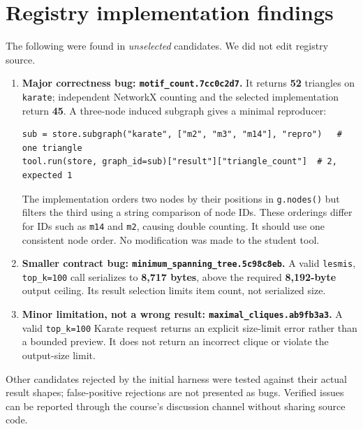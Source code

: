 \documentclass[10pt,a4paper]{article}
\newcommand{\tool}[1]{\texttt{#1}}
\begin{document}
\section{Registry implementation findings}
The following were found in \emph{unselected} candidates. We did not edit registry source.
\begin{enumerate}
\item \textbf{Major correctness bug: \tool{motif\_count.7cc0c2d7}.} It returns \textbf{52}
  triangles on \tool{karate}; independent NetworkX counting and the selected implementation return
  \textbf{45}. A three-node induced subgraph gives a minimal reproducer:
\begin{verbatim}
sub = store.subgraph("karate", ["m2", "m3", "m14"], "repro")   # one triangle
tool.run(store, graph_id=sub)["result"]["triangle_count"]  # 2, expected 1
\end{verbatim}
  The implementation orders two nodes by their positions in \tool{g.nodes()} but filters the third
  using a string comparison of node IDs. These orderings differ for IDs such as \tool{m14} and
  \tool{m2}, causing double counting. It should use one consistent node order. No modification was
  made to the student tool.
\item \textbf{Smaller contract bug: \tool{minimum\_spanning\_tree.5c98c8eb}.} A valid
  \tool{lesmis}, \tool{top\_k=100} call serializes to \textbf{8,717 bytes}, above the required
  \textbf{8,192-byte} output ceiling. Its result selection limits item count, not serialized size.
\item \textbf{Minor limitation, not a wrong result: \tool{maximal\_cliques.ab9fb3a3}.}
  A valid \tool{top\_k=100} Karate request returns an explicit size-limit error rather than a
  bounded preview. It does not return an incorrect clique or violate the output-size limit.
\end{enumerate}
Other candidates rejected by the initial harness were tested against their actual result shapes;
false-positive rejections are not presented as bugs. Verified issues can be reported through the
course's discussion channel without sharing source code.
\end{document}
